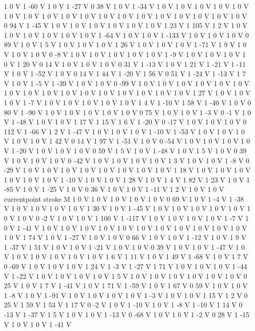 {{1 0 V
1 -60 V
1 0 V
1 -27 V
0 38 V
1 0 V
1 -34 V
1 0 V
1 0 V
1 0 V
1 0 V
1 0 V
1 0 V
1 0 V
1 0 V
1 0 V
1 0 V
1 0 V
1 0 V
1 0 V
1 0 V
1 0 V
1 0 V
1 0 V
1 0 V
0 94 V
1 -45 V
1 0 V
1 0 V
1 0 V
1 0 V
1 0 V
1 0 V
1 23 V
1 105 V
1 2 V
1 0 V
1 0 V
1 0 V
1 0 V
1 0 V
1 0 V
1 -64 V
1 0 V
1 0 V
1 -133 V
1 0 V
1 0 V
1 0 V
0 89 V
1 0 V
1 5 V
1 0 V
1 0 V
1 0 V
1 26 V
1 0 V
1 0 V
1 0 V
1 -71 V
1 9 V
1 0 V
1 0 V
1 0 V
0 -8 V
1 0 V
1 0 V
1 0 V
1 0 V
1 0 V
1 -9 V
1 0 V
1 0 V
1 0 V
1 0 V
1 20 V
0 14 V
1 0 V
1 0 V
1 0 V
0 31 V
1 -13 V
1 0 V
1 21 V
1 -21 V
1 -11 V
1 0 V
1 -52 V
1 0 V
0 14 V
1 44 V
1 -20 V
1 56 V
0 51 V
1 -24 V
1 -13 V
1 7 V
1 0 V
1 -5 V
1 -39 V
1 0 V
1 0 V
0 -99 V
1 0 V
1 0 V
1 0 V
1 0 V
1 0 V
1 0 V
1 0 V
1 0 V
1 0 V
1 0 V
1 0 V
1 0 V
1 0 V
1 0 V
1 0 V
1 0 V
1 27 V
1 0 V
1 0 V
1 0 V
1 -7 V
1 0 V
1 0 V
1 0 V
1 0 V
1 0 V
1 4 V
1 -10 V
1 58 V
1 -40 V
1 0 V
0 80 V
1 -90 V
1 0 V
1 0 V
1 0 V
1 0 V
1 0 V
0 75 V
1 0 V
1 0 V
1 -3 V
0 -1 V
1 0 V
1 -48 V
1 0 V
1 0 V
1 17 V
1 15 V
1 6 V
1 -20 V
0 -17 V
1 0 V
1 0 V
1 0 V
0 112 V
1 -66 V
1 2 V
1 -47 V
1 0 V
1 0 V
1 0 V
1 -10 V
1 -53 V
1 0 V
1 0 V
1 0 V
1 0 V
1 0 V
1 42 V
0 14 V
1 97 V
1 -51 V
1 0 V
0 -54 V
1 0 V
1 0 V
1 0 V
1 0 V
1 -20 V
1 0 V
1 0 V
1 0 V
0 59 V
1 5 V
1 0 V
1 -48 V
1 0 V
1 5 V
1 0 V
0 39 V
1 0 V
1 0 V
1 0 V
0 -42 V
1 0 V
1 0 V
1 0 V
1 0 V
1 3 V
1 0 V
1 0 V
1 -8 V
0 -29 V
1 0 V
1 0 V
1 0 V
1 0 V
1 0 V
1 0 V
1 0 V
1 0 V
1 18 V
1 0 V
1 0 V
1 0 V
1 0 V
1 0 V
1 0 V
1 -10 V
1 0 V
1 0 V
1 28 V
1 0 V
1 4 V
1 82 V
1 23 V
1 0 V
1 -85 V
1 0 V
1 -25 V
1 0 V
0 36 V
1 0 V
1 0 V
1 -11 V
1 2 V
1 0 V
1 0 V
currentpoint stroke M
1 0 V
1 0 V
1 0 V
1 0 V
1 0 V
0 69 V
1 0 V
1 -4 V
1 -38 V
1 0 V
1 0 V
1 0 V
1 0 V
1 30 V
1 0 V
1 -45 V
1 0 V
1 0 V
1 0 V
1 0 V
1 0 V
1 0 V
1 0 V
0 -2 V
1 0 V
1 0 V
1 100 V
1 -117 V
1 0 V
1 0 V
1 0 V
1 0 V
1 -7 V
1 0 V
1 -41 V
1 0 V
1 0 V
1 0 V
1 0 V
1 0 V
1 0 V
1 0 V
1 0 V
1 0 V
1 0 V
1 0 V
1 0 V
1 74 V
1 0 V
1 -27 V
1 0 V
1 0 V
0 66 V
1 0 V
1 0 V
1 -12 V
1 0 V
1 9 V
1 -37 V
1 51 V
1 0 V
1 0 V
1 -21 V
1 0 V
1 0 V
0 39 V
1 0 V
1 0 V
1 -47 V
1 0 V
1 0 V
1 0 V
1 0 V
1 0 V
1 0 V
1 6 V
1 11 V
1 0 V
1 49 V
1 -68 V
1 0 V
1 7 V
0 -69 V
1 0 V
1 0 V
1 0 V
1 24 V
1 -3 V
1 -27 V
1 71 V
1 0 V
1 0 V
1 0 V
1 -44 V
1 -22 V
1 0 V
1 0 V
1 0 V
1 0 V
1 5 V
1 0 V
1 0 V
1 0 V
1 0 V
1 0 V
1 0 V
0 25 V
1 0 V
1 7 V
1 -41 V
1 0 V
1 71 V
1 -59 V
1 0 V
1 67 V
0 59 V
1 0 V
1 0 V
1 -8 V
1 0 V
1 -91 V
1 0 V
1 0 V
1 0 V
1 0 V
1 -3 V
1 0 V
1 0 V
1 15 V
1 2 V
0 25 V
1 59 V
1 53 V
1 17 V
0 -2 V
1 0 V
1 -10 V
1 0 V
1 -8 V
1 -10 V
1 14 V
0 -13 V
1 -37 V
1 5 V
1 0 V
1 0 V
1 -13 V
0 -68 V
1 0 V
1 0 V
1 -2 V
0 28 V
1 -15 V
1 0 V
1 0 V
1 -41 V
}}
